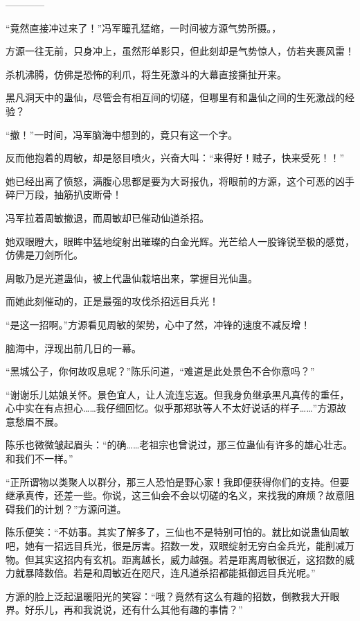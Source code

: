 
\begin{this_body}

------------

“竟然直接冲过来了！”冯军瞳孔猛缩，一时间被方源气势所摄。，

方源一往无前，只身冲上，虽然形单影只，但此刻却是气势惊人，仿若夹裹风雷！

杀机沸腾，仿佛是恐怖的利爪，将生死激斗的大幕直接撕扯开来。

黑凡洞天中的蛊仙，尽管会有相互间的切磋，但哪里有和蛊仙之间的生死激战的经验？

“撤！”一时间，冯军脑海中想到的，竟只有这一个字。

反而他抱着的周敏，却是怒目喷火，兴奋大叫：“来得好！贼子，快来受死！！”

她已经出离了愤怒，满腹心思都是要为大哥报仇，将眼前的方源，这个可恶的凶手碎尸万段，抽筋扒皮断骨！

冯军拉着周敏撤退，而周敏却已催动仙道杀招。

她双眼瞪大，眼眸中猛地绽射出璀璨的白金光辉。光芒给人一股锋锐至极的感觉，仿佛是刀剑所化。

周敏乃是光道蛊仙，被上代蛊仙栽培出来，掌握目光仙蛊。

而她此刻催动的，正是最强的攻伐杀招远目兵光！

“是这一招啊。”方源看见周敏的架势，心中了然，冲锋的速度不减反增！

脑海中，浮现出前几日的一幕。

“黑城公子，你何故叹息呢？”陈乐问道，“难道是此处景色不合你意吗？”

“谢谢乐儿姑娘关怀。景色宜人，让人流连忘返。但我身负继承黑凡真传的重任，心中实在有点担心……我仔细回忆。似乎那郑驮等人不太好说话的样子……”方源故意愁眉不展。

陈乐也微微皱起眉头：“的确……老祖宗也曾说过，那三位蛊仙有许多的雄心壮志。和我们不一样。”

“正所谓物以类聚人以群分，那三人恐怕是野心家！我即便获得你们的支持。但要继承真传，还差一些。你说，这三仙会不会以切磋的名义，来找我的麻烦？故意阻碍我们的计划？”方源问道。

陈乐便笑：“不妨事。其实了解多了，三仙也不是特别可怕的。就比如说蛊仙周敏吧，她有一招远目兵光，很是厉害。招数一发，双眼绽射无穷白金兵光，能削减万物。但其实这招内有玄机。距离越长，威力越强。若是距离周敏很近，这招数的威力就暴降数倍。若是和周敏近在咫尺，连凡道杀招都能抵御远目兵光呢。”

方源的脸上泛起温暖阳光的笑容：“哦？竟然有这么有趣的招数，倒教我大开眼界。好乐儿，再和我说说，还有什么其他有趣的事情？”


\end{this_body}
